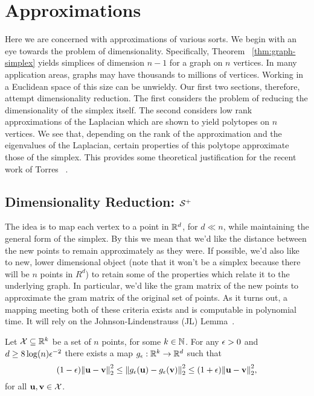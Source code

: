 \section{Approximations} 
\label{sec:algorithmics_approximations}
Here we are concerned  with  approximations of various sorts. We begin  with an eye towards the problem of  dimensionality. Specifically, Theorem ~\ref{thm:graph-simplex} yields simplices of dimension $n-1$ for a graph on $n$ vertices. In  many application areas, graphs may have thousands  to  millions of vertices. Working in a Euclidean space  of  this  size can be unwieldy. Our first two  sections,  therefore, attempt dimensionality reduction. The first  considers the problem of reducing the dimensionality of the simplex itself. The second considers low rank approximations of  the Laplacian which are  shown to yield polytopes on  $n$ vertices. We see that, depending on the rank of the  approximation and the eigenvalues of the Laplacian, certain properties of this polytope approximate  those of the simplex. This provides some  theoretical justification for  the  recent work of Torres \etal~\cite{torres2019geometric}. 

\subsection{Dimensionality  Reduction: \texorpdfstring{$\mathcal{S}^+$}{the inverse simplex}}
\label{sec:algorithmics_JL}
The idea is to  map each vertex to a  point in $\mathbb{R}^d$, for $d\ll n$, while maintaining the general form of the simplex. By this we mean that we'd like the distance between the new  points  to remain approximately  as they  were. If possible, we'd also  like to new, lower  dimensional  object (note that it won't  be  a simplex because there will  be  $n$ points in $ R^d$) to retain some of the properties which  relate it  to the underlying graph. In  particular, we'd like the gram matrix  of the new  points to  approximate the gram  matrix of the original  set  of points. As it turns out,  a  mapping meeting both  of these criteria exists and is computable  in polynomial time. It will   rely on the Johnson-Lindenstrauss  (JL) Lemma~\cite{johnson1984extensions,dasgupta2003elementary}. 

\begin{theorem}
	Let $\mathcal{X}\subseteq \mathbb{R}^k$ be a set of $n$ points, for some $k\in\mathbb{N}$. For any $\epsilon>0$ and $d\geq 8\log(n)\epsilon^{-2}$ there exists a map $g_\epsilon:\mathbb{R}^k\to\mathbb{R}^d$ such that 
	\begin{equation*}
	(1-\epsilon)\norm{\vb{u}-\vb{v}}_2^2 \leq \norm{g_\epsilon(\vb{u}) - g_\epsilon(\vb{v})}_2^2 \leq (1+\epsilon)\norm{\vb{u}-\vb{v}}_2^2,
	\end{equation*}
	for all $\vb{u},\vb{v}\in \mathcal{X}$. 
\end{theorem}

